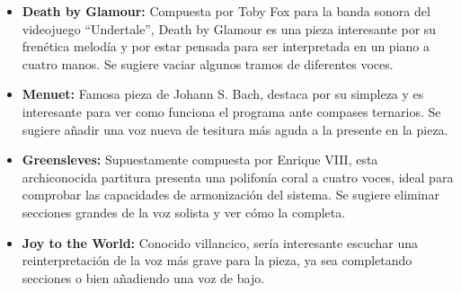  \begin{itemize}
 	\item \textbf{Death by Glamour:} Compuesta por Toby Fox para la banda sonora del videojuego ``Undertale'', Death by Glamour es una pieza interesante por su frenética melodía y por estar pensada para ser interpretada en un piano a cuatro manos. Se sugiere vaciar algunos tramos de diferentes voces.
 	\item \textbf{Menuet:} Famosa pieza de Johann S. Bach, destaca por su simpleza y es interesante para ver como funciona el programa ante compases ternarios. Se sugiere añadir una voz nueva de tesitura más aguda a la presente en la pieza.
 	\item \textbf{Greensleves:} Supuestamente compuesta por Enrique VIII, esta archiconocida partitura presenta una polifonía coral a cuatro voces, ideal para comprobar las capacidades de armonización del sistema. Se sugiere eliminar secciones grandes de la voz solista y ver cómo la completa.
 	\item \textbf{Joy to the World:} Conocido villancico, sería interesante escuchar una reinterpretación de la voz más grave para la pieza, ya sea completando secciones o bien añadiendo una voz de bajo.
 \end{itemize}

